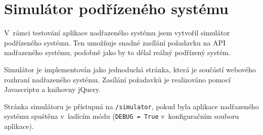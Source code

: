 \section{Simulátor podřízeného systému}

V~rámci testování aplikace nadřazeného systému jsem vytvořil simulátor podřízeného systému. Ten umožňuje snadné zasílání požadavku na API nadřazeného systému, podobně jako by to dělal reálný podřízený systém.

Simulátor je implementován jako jednoduchá stránka, která je součástí webového rozhraní nadřazeného systému. Zasílání požadavků je realizováno pomocí Javascriptu a knihovny jQuery. 

Stránka simulátoru je přístupná na \texttt{/simulator}, pokud byla aplikace nadřazeného systému spuštěna v~ladícím módu (\texttt{DEBUG = True} v~konfiguračním souboru aplikace).

